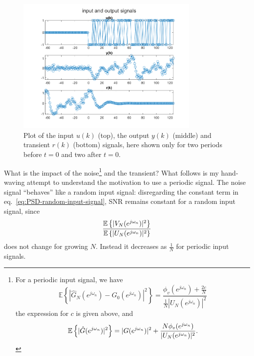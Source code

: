 \begin{figure}[h]
  \centering
  \includegraphics[width=0.8\textwidth]{"05_lect/transient-noise-time-domain.png"}
  \caption{Plot of the input $u(k)$ (top), the output $y(k)$ (middle) and transient $r(k)$ (bottom) signals, here shown only for two periods before $t=0$ and two after $t=0$.}
  \label{fig:transient-response-time-domain}
\end{figure}

What is the impact of the noise\footnote{For a periodic input signal, we have
  \begin{equation}
    \label{eq:variance-ETFE}
    \mathbb{E}\left\{\left|\hat{G}_N(e^{j\omega_n}) - G_0(e^{j\omega_n})\right|^2\right\} = \frac{\phi_v(e^{j\omega_n}) + \frac{2c}{N}}{\frac{1}{N}|U_N(e^{j\omega_n})|^2}
  \end{equation}
  the expression for $c$ is given above, and
  \begin{equation*}
    \mathbb{E}\left\{|\hat{G}(e^{j\omega_n})|^2\right\} = |G(e^{j\omega_n})|^2 + \frac{N\phi_v(e^{j\omega_n})}{|U_N(e^{j\omega_n})|^2}.
  \end{equation*}} and the transient? What follows is my hand-waving attempt to understand the motivation to use a periodic signal. The noise signal ``behaves'' like a random input signal: disregarding the constant term in eq.~\eqref{eq:PSD-random-input-signal}, SNR remains constant for a random input signal, since
\begin{equation*}
  \frac{\mathbb{E}\left\{|V_N(e^{j\omega_n})|^2\right\}}{\mathbb{E}\left\{|U_N(e^{j\omega_n})|^2\right\}}
\end{equation*}
does not change for growing $N$. Instead it decreases as $\frac{1}{N}$ for periodic input signals.

